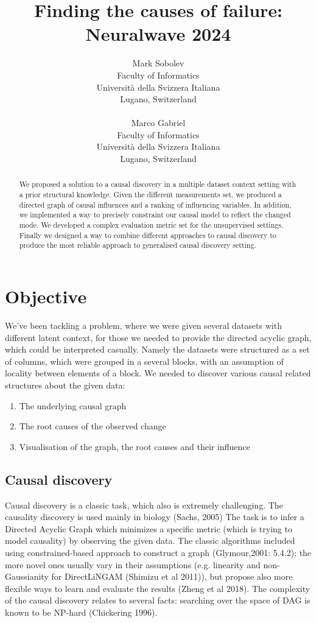 \documentclass{article}
\title{Finding the causes of failure: Neuralwave 2024}
\author{
	Mark Sobolev\\
	Faculty of Informatics\\
	Università della Svizzera Italiana\\
	Lugano, Switzerland \\
	\\
	\And
	Marco Gabriel \\
	Faculty of Informatics \\
	Università della Svizzera Italiana\\
	Lugano, Switzerland \\
}
\begin{document}
	
	
	\maketitle
	

	\begin{abstract}
		We proposed a solution to a causal discovery in a multiple dataset context setting with a prior structural knowledge. Given the different measurements set, we produced a directed graph of causal influences and a ranking of influencing variables. In addition, we implemented a way to precisely constraint our causal model to reflect the changed mode. We developed a complex evaluation metric set for the unsupervised settings. Finally we designed a way to combine different approaches to causal discovery to produce the most reliable approach to generalised causal discovery setting. 
	\end{abstract}
	
	



	\section{Objective}
	
	We've been tackling a problem, where we were given several datasets with different latent context, for those we needed to provide the directed acyclic graph, which could be interpreted casually. Namely the datasets were structured as a set of columns, which were grouped in a several blocks, with an assumption of locality between elements of a block. We needed to discover various causal related structures about the given data:
	
	\begin{enumerate}
		\item The underlying causal graph
		\item The root causes of the observed change
		\item Visualisation of the graph, the root causes and their influence
	\end{enumerate}
	
	\subsection{Causal discovery}
	
	Causal discovery is a classic task, which also is extremely challenging. The causality discovery is used mainly in biology (Sachs, 2005) The task is to infer a Directed Acyclic Graph which minimizes a specific metric (which is trying to model causality) by observing the given data. The classic algorithms included using constrained-based approach to construct a graph (Glymour,2001: 5.4.2); the more novel ones usually vary in their assumptions (e.g. linearity and non-Gaussianity for DirectLiNGAM (Shimizu et al 2011)), but propose also more flexible ways to learn and evaluate the results (Zheng et al 2018). The complexity of the causal discovery relates to several facts: searching over the space of DAG is known to be NP-hard (Chickering 1996). 
	
\end{document}
